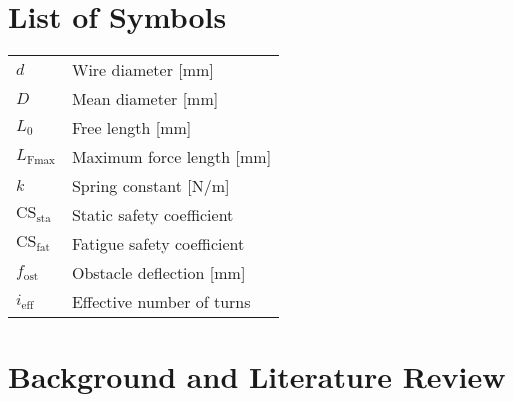 \documentclass[11pt]{article}
\begin{document}
\section*{List of Symbols}
\begin{tabular}{ll}
    $d$ & Wire diameter [mm] \\
    $D$ & Mean diameter [mm] \\
    $L_0$ & Free length [mm] \\
    $L_\text{Fmax}$ & Maximum force length [mm] \\
    $k$ & Spring constant [N/m] \\
    $\text{CS}_\text{sta}$ & Static safety coefficient \\
    $\text{CS}_\text{fat}$ & Fatigue safety coefficient \\
    $f_\text{ost}$ & Obstacle deflection [mm] \\
    $i_\text{eff}$ & Effective number of turns \\
\end{tabular}

\newpage
\section{Background and Literature Review}
\end{document}
